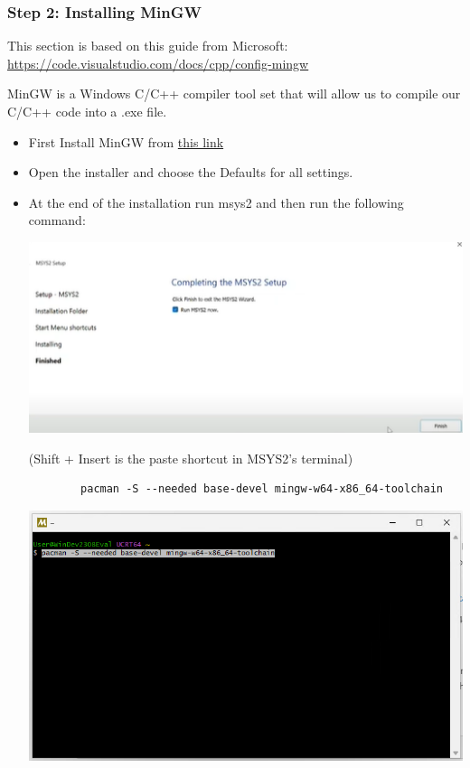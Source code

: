 \subsubsection{Step 2: Installing MinGW}
This section is based on this guide from Microsoft: \textcolor{cyan}{\href{https://code.visualstudio.com/docs/cpp/config-mingw}{https://code.visualstudio.com/docs/cpp/config-mingw}}

MinGW is a Windows C/C++ compiler tool set that will allow us to compile our C/C++ code into a .exe file.

\begin{itemize}
    \item First Install MinGW from \textcolor{cyan}{
    \href{https://github.com/msys2/msys2-installer/releases/download/2023-05-26/msys2-x86_64-20230526.exe}{this link}}
    \item Open the installer and choose the Defaults for all settings.
    \item At the end of the installation run msys2 and then run the following command:
    
    \includegraphics[width=6in]{images/windowsVSCodeSetup/image8.png}
    
    (Shift + Insert is the paste shortcut in MSYS2’s terminal)
    \begin{verbatim}
        pacman -S --needed base-devel mingw-w64-x86_64-toolchain
    \end{verbatim}
    
    \includegraphics[width=6in]{images/windowsVSCodeSetup/image7.png}
    

\end{itemize}
